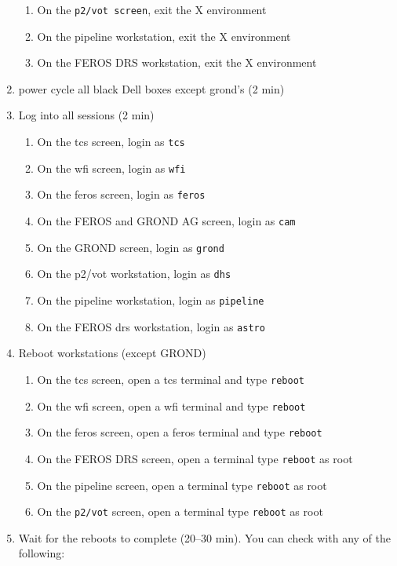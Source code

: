 \documentclass[11pt,fleqn,a4paper]{book}
\begin{document}
\begin{enumerate}
\begin{enumerate}
        \item On the \texttt{p2/vot screen}, exit the X environment
        \item On the pipeline workstation, exit the X environment
        \item On the FEROS DRS workstation, exit the X environment
    \end{enumerate}
\item \label{list:soft:power}\Gls{power cycle} all black Dell boxes except \gls{grond}'s (2 min) 
\item Log into all sessions (2 min)
\begin{enumerate}
    \item On the \gls{tcs} screen, login as \texttt{tcs}
    \item On the \gls{wfi} screen, login as \texttt{wfi}
    \item On the \gls{feros} screen, login as \texttt{feros}
    \item On the FEROS and GROND AG screen, login as \texttt{cam}
    \item On the GROND screen, login as \texttt{grond}
    \item On the \gls{p2}/\gls{vot} workstation, login as \texttt{dhs}
    \item On the pipeline workstation, login as \texttt{pipeline}
    \item On the FEROS \gls{drs} workstation, login as \texttt{astro}
\end{enumerate}
\item Reboot workstations (except GROND)
\begin{enumerate}
    \item On the \gls{tcs} screen, open a tcs terminal and type \texttt{reboot}
    \item On the \gls{wfi} screen, open a wfi terminal and type \texttt{reboot} 
    \item On the \gls{feros} screen, open a feros terminal and type \texttt{reboot}
    \item On the FEROS DRS screen, open a terminal type \texttt{reboot} as root
    \item On the pipeline screen, open a terminal type \texttt{reboot} as root
    \item On the \texttt{p2/vot} screen, open a terminal type \texttt{reboot} as root
\end{enumerate}
\item Wait for the reboots to complete (20--30 min). You can check with any of the following:
    \begin{itemize}

\end{itemize}
\end{enumerate}
\end{document}
